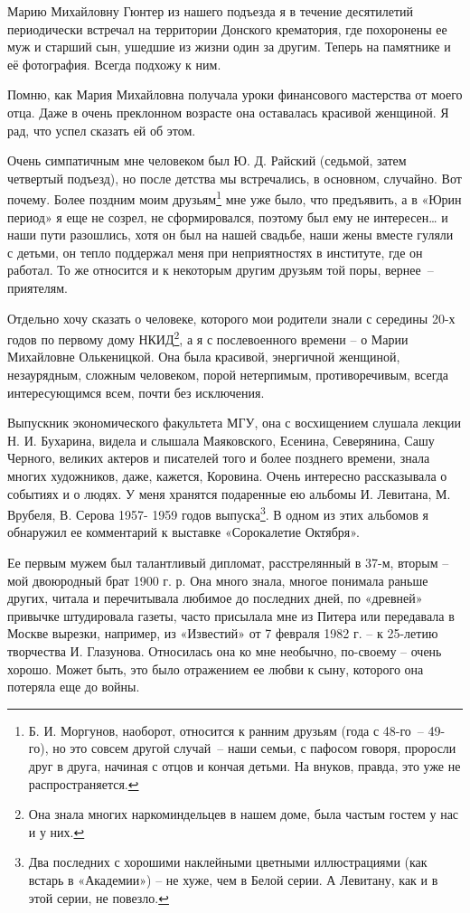 \indent

Марию Михайловну Гюнтер из нашего подъезда я в течение десятилетий периодически встречал на территории Донского крематория, где похоронены ее муж и старший сын, ушедшие из жизни один за другим. Теперь на памятнике и её фотография. Всегда подхожу к ним.

Помню, как Мария Михайловна получала уроки финансового мастерства от моего отца. Даже в очень преклонном возрасте она оставалась красивой женщиной. Я рад, что успел сказать ей об этом.
    
Очень симпатичным мне человеком был Ю. Д. Райский (седьмой, затем четвертый подъезд), но после детства мы встречались, в  основном, случайно. Вот почему. Более поздним моим друзьям\protect\footnote{Б. И. Моргунов, наоборот, относится к ранним друзьям (года с 48-го~-- 49-го), но это совсем другой случай~-- наши семьи, с пафосом говоря, проросли друг в друга, начиная с отцов и кончая детьми. На внуков, правда, это уже не распространяется.}  мне уже было, что предъявить, а в «Юрин период» я еще не созрел, не сформировался, поэтому был ему не интересен… и наши пути разошлись, хотя он был на нашей свадьбе, наши жены вместе гуляли с детьми, он тепло поддержал меня при неприятностях в институте, где он работал. То же относится и к некоторым другим друзьям той поры, вернее~-- приятелям.


Отдельно хочу сказать о человеке, которого мои родители знали с середины 20-х годов по первому дому НКИД\protect\footnote{Она знала многих наркоминдельцев в нашем доме, была частым гостем у нас и у них.}, а я с послевоенного времени – о Марии Михайловне Олькеницкой. Она была красивой, энергичной женщиной, незаурядным, сложным человеком, порой нетерпимым, противоречивым, всегда интересующимся всем, почти без исключения.
 
Выпускник экономического факультета МГУ, она с восхищением слушала лекции Н. И. Бухарина, видела и слышала Маяковского, Есенина, Северянина, Сашу Черного, великих актеров и писателей того и более позднего времени, знала многих художников, даже, кажется, Коровина. Очень интересно рассказывала о событиях и о людях. У меня хранятся подаренные ею альбомы И. Левитана, М. Врубеля, В. Серова  1957- 1959 годов выпуска\protect\footnote{Два последних с хорошими наклейными цветными иллюстрациями (как встарь в «Академии») – не хуже, чем в Белой серии. А Левитану, как и в этой серии, не повезло.}. В одном из этих альбомов я обнаружил ее комментарий к выставке «Сорокалетие Октября».  

Ее первым мужем был талантливый дипломат, расстрелянный в 37-м, вторым – мой двоюродный брат 1900 г. р. Она много знала, многое понимала раньше других, читала и перечитывала любимое до последних дней, по «древней» привычке штудировала газеты, часто присылала мне из Питера или передавала в Москве  вырезки, например,  из «Известий» от 7 февраля 1982 г.  – к 25-летию творчества И. Глазунова.
Относилась она ко мне необычно,  по-своему – очень хорошо. Может быть, это было отражением ее любви к сыну, которого она потеряла еще до войны.

